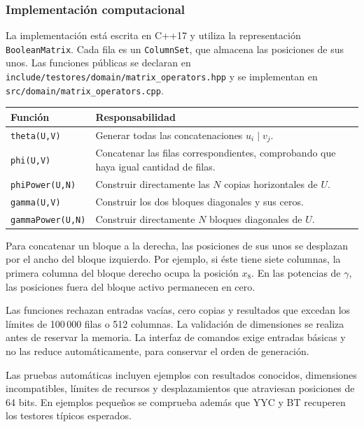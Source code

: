 \subsubsection*{Implementación computacional}

La implementación está escrita en C++17 y utiliza la representación
\texttt{BooleanMatrix}. Cada fila es un \texttt{ColumnSet}, que
almacena las posiciones de sus unos. Las funciones públicas se
declaran en \texttt{include/testores/domain/matrix\_operators.hpp}
y se implementan en \texttt{src/domain/matrix\_operators.cpp}.

\begin{center}
\begin{tabular}{l p{9cm}}
\toprule
Función & Responsabilidad\\
\midrule
\texttt{theta(U,V)} & Generar todas las concatenaciones $u_i\mid v_j$.\\
\texttt{phi(U,V)} & Concatenar las filas correspondientes, comprobando que haya igual cantidad de filas.\\
\texttt{phiPower(U,N)} & Construir directamente las $N$ copias horizontales de $U$.\\
\texttt{gamma(U,V)} & Construir los dos bloques diagonales y sus ceros.\\
\texttt{gammaPower(U,N)} & Construir directamente $N$ bloques diagonales de $U$.\\
\bottomrule
\end{tabular}
\end{center}

Para concatenar un bloque a la derecha, las posiciones de sus unos
se desplazan por el ancho del bloque izquierdo. Por ejemplo, si
éste tiene siete columnas, la primera columna del bloque derecho
ocupa la posición $x_8$. En las potencias de $\gamma$, las posiciones
fuera del bloque activo permanecen en cero.

Las funciones rechazan entradas vacías, cero copias y resultados
que excedan los límites de 100\,000 filas o 512 columnas. La
validación de dimensiones se realiza antes de reservar la memoria.
La interfaz de comandos exige entradas básicas y no las reduce
automáticamente, para conservar el orden de generación.

Las pruebas automáticas incluyen ejemplos con resultados conocidos,
dimensiones incompatibles, límites de recursos y desplazamientos
que atraviesan posiciones de 64 bits. En ejemplos pequeños se
comprueba además que YYC y BT recuperen los testores típicos esperados.

